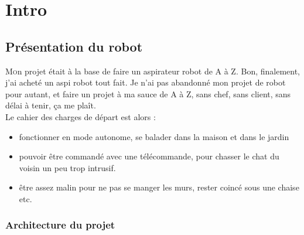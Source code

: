 
\chapter{Intro}

\section{Présentation du robot}
\lettrine[lines=1]{M}on projet était à la base de faire un aspirateur robot de A à Z. Bon, finalement, j'ai acheté un aspi robot tout fait. Je n'ai pas abandonné mon projet de robot pour autant, et faire un projet à ma sauce de A à Z, sans chef, sans client, sans délai à tenir, ça me plaît.\\
Le cahier des charges  de départ est alors :


\begin{itemize}
\item fonctionner en mode autonome, se balader dans la maison et dans le jardin
\item pouvoir être commandé avec une télécommande, pour chasser le chat du voisin un peu trop intrusif.
 
\item être assez malin pour ne pas se manger les murs, rester coincé sous une chaise etc.

\end{itemize}
 
 



\subsection{Architecture du projet}

